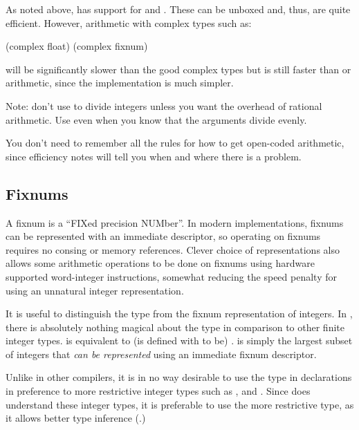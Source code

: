 As noted above, \cmucl{} has support for 
and .  These can be unboxed and, thus,
are quite efficient.  However, arithmetic with complex types such as:
\begin{lisp}
(complex float)
(complex fixnum)
\end{lisp}
will be significantly slower than the good complex types but is still
faster than  or  arithmetic, since the
implementation is much simpler.

Note: don't use \code{/} to divide integers unless you want the
overhead of rational arithmetic.  Use  even when you
know that the arguments divide evenly.

You don't need to remember all the rules for how to get open-coded
arithmetic, since efficiency notes will tell you when and where there
is a problem\dash{}.


\subsection{Fixnums}
\label{fixnums}

A fixnum is a ``FIXed precision NUMber''.  In modern \llisp{}
implementations, fixnums can be represented with an immediate
descriptor, so operating on fixnums requires no consing or memory
references.  Clever choice of representations also allows some
arithmetic operations to be done on fixnums using hardware supported
word-integer instructions, somewhat reducing the speed penalty for
using an unnatural integer representation.

It is useful to distinguish the  type from the fixnum
representation of integers.  In \python, there is absolutely nothing
magical about the  type in comparison to other finite
integer types.   is equivalent to (is defined with
 to be) .   is
simply the largest subset of integers that {\em can be represented}
using an immediate fixnum descriptor.

Unlike in other \clisp{} compilers, it is in no way desirable to use
the  type in declarations in preference to more
restrictive integer types such as ,  and .  Since \python{} does
understand these integer types, it is preferable to use the more
restrictive type, as it allows better type inference
(.)

